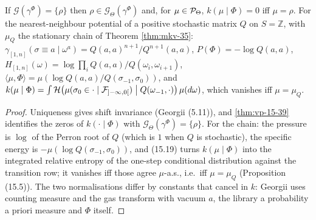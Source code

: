 \begin{example}[Georgii (15.40)]
    \label{ex:vp-15-40}
    \leanok

    If $\mathcal G(\gamma^\Phi) = \{\rho\}$ then $\rho \in \mathcal G_\Theta(\gamma^\Phi)$ and, for
    $\mu \in \mathcal{P}_\Theta$, $k(\mu \mid \Phi) = 0$ iff $\mu = \rho$. For the nearest-neighbour
    potential of a positive stochastic matrix $Q$ on $S = \mathbb Z$, with $\mu_Q$ the stationary
    chain of Theorem \ref{thm:mkv-35}:
    $\gamma_{[1,n]}(\sigma \equiv a \mid \omega^a) = Q(a,a)^{n+1}/Q^{n+1}(a,a)$,
    $P(\Phi) = -\log Q(a,a)$,
    $H_{[1,n]}(\omega) = \log\prod_i Q(a,a)/Q(\omega_i,\omega_{i+1})$,
    $\langle\mu,\Phi\rangle = \mu(\log Q(a,a)/Q(\sigma_{-1},\sigma_0))$, and
    $k(\mu \mid \Phi) = \int \mathcal H\bigl(\mu(\sigma_0 \in \cdot \mid \mathcal F_{]-\infty,0[})
    \bigm| Q(\omega_{-1},\cdot)\bigr)\,\mu(d\omega)$, which vanishes iff $\mu = \mu_Q$.
\end{example}
\begin{proof}
    \leanok
    Uniqueness gives shift invariance (Georgii (5.11)), and \ref{thm:vp-15-39} identifies the zeros
    of $k(\cdot\mid\Phi)$ with $\mathcal G_\Theta(\gamma^\Phi) = \{\rho\}$. For the chain: the
    pressure is $\log$ of the Perron root of $Q$ (which is $1$ when $Q$ is stochastic), the specific
    energy is $-\mu(\log Q(\sigma_{-1},\sigma_0))$, and (15.19) turns $k(\mu\mid\Phi)$ into the
    integrated relative entropy of the one-step conditional distribution against the transition row;
    it vanishes iff those agree $\mu$-a.s., i.e.\ iff $\mu = \mu_Q$ (Proposition (15.5)).
    The two normalisations differ by constants that cancel in $k$: Georgii uses counting measure
    and the gas transform with vacuum $a$, the library a probability a priori measure and $\Phi$
    itself.
\end{proof}
